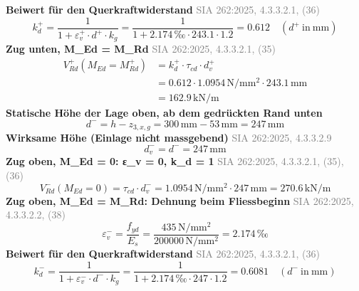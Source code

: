 \documentclass[11pt,a4paper]{article}
\newcommand{\normref}[1]{{\small\textcolor{gray}{#1}}}
\begin{document}
\noindent\textbf{Beiwert für den Querkraftwiderstand} \hfill \normref{SIA 262:2025, 4.3.3.2.1, (36)}
\begin{equation*}
k_d^{+} = \frac{1}{1 + \varepsilon_v^{+} \cdot d^{+} \cdot k_g} = \frac{1}{1 + 2.174\,\text{‰} \cdot 243.1 \cdot 1.2} = 0.612 \quad \left(d^{+}\ \text{in}\ \mathrm{mm}\right)
\end{equation*}
\noindent\textbf{Zug unten, M\_Ed = M\_Rd} \hfill \normref{SIA 262:2025, 4.3.3.2.1, (35)}
\begin{equation*}
\begin{aligned}
  V_{Rd}^{+}(M_{Ed} = M_{Rd}^{+}) &= k_d^{+} \cdot \tau_{cd} \cdot d_v^{+} \\
  &= 0.612 \cdot 1.0954\,\mathrm{N}/\mathrm{mm}^{2} \cdot 243.1\,\mathrm{mm} \\
  &= 162.9\,\mathrm{kN}/\mathrm{m}
\end{aligned}
\end{equation*}
\noindent\textbf{Statische Höhe der Lage oben, ab dem gedrückten Rand unten}
\begin{equation*}
d^{-} = h - z_{3,x,g} = 300\,\mathrm{mm} - 53\,\mathrm{mm} = 247\,\mathrm{mm}
\end{equation*}
\noindent\textbf{Wirksame Höhe (Einlage nicht massgebend)} \hfill \normref{SIA 262:2025, 4.3.3.2.9}
\begin{equation*}
d_v^{-} = d^{-} = 247\,\mathrm{mm}
\end{equation*}
\noindent\textbf{Zug oben, M\_Ed = 0: ε\_v = 0, k\_d = 1} \hfill \normref{SIA 262:2025, 4.3.3.2.1, (35), (36)}
\begin{equation*}
V_{Rd}^{-}(M_{Ed} = 0) = \tau_{cd} \cdot d_v^{-} = 1.0954\,\mathrm{N}/\mathrm{mm}^{2} \cdot 247\,\mathrm{mm} = 270.6\,\mathrm{kN}/\mathrm{m}
\end{equation*}
\noindent\textbf{Zug oben, M\_Ed = M\_Rd: Dehnung beim Fliessbeginn} \hfill \normref{SIA 262:2025, 4.3.3.2.2, (38)}
\begin{equation*}
\varepsilon_v^{-} = \frac{f_{yd}}{E_s} = \frac{435\,\mathrm{N}/\mathrm{mm}^{2}}{200000\,\mathrm{N}/\mathrm{mm}^{2}} = 2.174\,\text{‰}
\end{equation*}
\noindent\textbf{Beiwert für den Querkraftwiderstand} \hfill \normref{SIA 262:2025, 4.3.3.2.1, (36)}
\begin{equation*}
k_d^{-} = \frac{1}{1 + \varepsilon_v^{-} \cdot d^{-} \cdot k_g} = \frac{1}{1 + 2.174\,\text{‰} \cdot 247 \cdot 1.2} = 0.6081 \quad \left(d^{-}\ \text{in}\ \mathrm{mm}\right)
\end{equation*}
\end{document}
